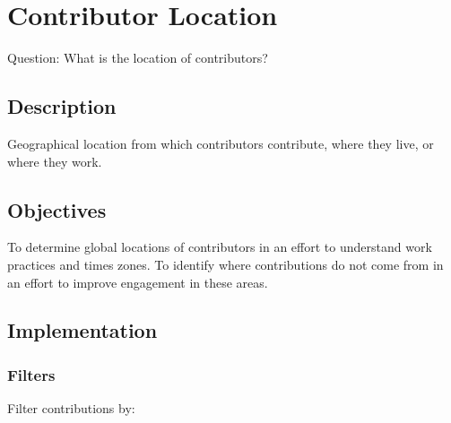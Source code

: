 \hypertarget{contributor-location}{%
\section{Contributor Location}\label{contributor-location}}

Question: What is the location of contributors?

\hypertarget{description}{%
\subsection{Description}\label{description}}

Geographical location from which contributors contribute, where they
live, or where they work.

\hypertarget{objectives}{%
\subsection{Objectives}\label{objectives}}

To determine global locations of contributors in an effort to understand
work practices and times zones. To identify where contributions do not
come from in an effort to improve engagement in these areas.

\hypertarget{implementation}{%
\subsection{Implementation}\label{implementation}}

\hypertarget{filters}{%
\subsubsection{Filters}\label{filters}}

Filter contributions by:

